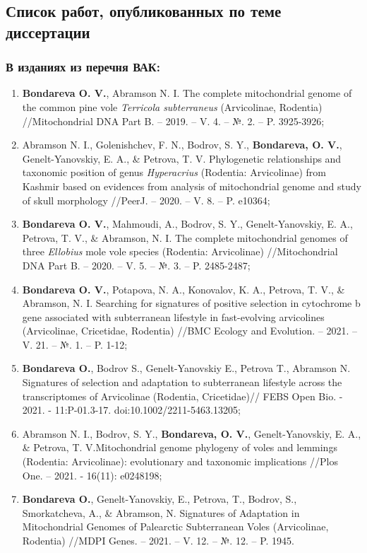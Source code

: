 \newpage
\begin{small}
\subsection*{Список работ, опубликованных по теме диссертации}
\subsubsection*{В изданиях из перечня ВАК:}

\begin{enumerate}
\item[\textbullet] \textbf{Bondareva O. V.}, Abramson N. I. The complete mitochondrial genome of the common pine vole \textit{Terricola subterraneus} (Arvicolinae, Rodentia) //Mitochondrial DNA Part B. – 2019. – V. 4. – №. 2. – P. 3925-3926;
\item[\textbullet] Abramson N. I., Golenishchev, F. N., Bodrov, S. Y., \textbf{Bondareva, O. V.}, Genelt-Yanovskiy, E. A., \& Petrova, T. V. Phylogenetic relationships and taxonomic position of genus \textit{Hyperacrius} (Rodentia: Arvicolinae) from Kashmir based on evidences from analysis of mitochondrial genome and study of skull morphology //PeerJ. – 2020. – V. 8. – P. e10364;
\item[\textbullet] \textbf{Bondareva O. V.}, Mahmoudi, A., Bodrov, S. Y., Genelt-Yanovskiy, E. A., Petrova, T. V., \& Abramson, N. I. The complete mitochondrial genomes of three \textit{Ellobius} mole vole species (Rodentia: Arvicolinae) //Mitochondrial DNA Part B. – 2020. – V. 5. – №. 3. – P. 2485-2487; 
\item[\textbullet] \textbf{Bondareva O. V.}, Potapova, N. A., Konovalov, K. A., Petrova, T. V., \& Abramson, N. I. Searching for signatures of positive selection in cytochrome b gene associated with subterranean lifestyle in fast-evolving arvicolines (Arvicolinae, Cricetidae, Rodentia) //BMC Ecology and Evolution. – 2021. – V. 21. – №. 1. – P. 1-12;
\item[\textbullet] \textbf{Bondareva O.}, Bodrov S., Genelt-Yanovskiy E., Petrova T., Abramson N. Signatures of selection and adaptation to subterranean lifestyle across the transcriptomes of Arvicolinae (Rodentia, Cricetidae)// FEBS Open Bio. - 2021. - 11:P-01.3-17. doi:10.1002/2211-5463.13205;
\item[\textbullet] Abramson N. I., Bodrov, S. Y., \textbf{Bondareva, O. V.}, Genelt-Yanovskiy, E. A., \& Petrova, T. V.Mitochondrial genome phylogeny of voles and lemmings (Rodentia: Arvicolinae): evolutionary and taxonomic implications //Plos One. – 2021. - 16(11): e0248198;
\item[\textbullet]  \textbf{Bondareva O.}, Genelt-Yanovskiy, E., Petrova, T., Bodrov, S., Smorkatcheva, A., \& Abramson, N.  Signatures of Adaptation in Mitochondrial Genomes of Palearctic Subterranean Voles (Arvicolinae, Rodentia) //MDPI Genes. – 2021. – V. 12. – №. 12. – P. 1945.
\end{enumerate}


\end{small}
